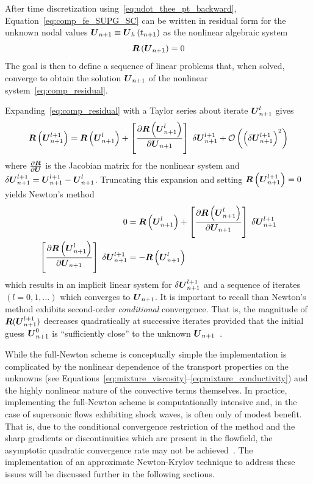 After time discretization using~\eqref{eq:udot_thee_pt_backward}, Equation~\eqref{eq:comp_fe_SUPG_SC} can be written in residual form for the unknown nodal values ${\boldsymbol{U}}_{n+1}\equiv{\boldsymbol{U}}_h\left(t_{n+1}\right)$ as the nonlinear algebraic system
\begin{equation}
  \label{eq:comp_residual}  
  {\boldsymbol{R}}\left({\boldsymbol{U}}_{n+1}\right) = 0 
\end{equation}
The goal is then to define a sequence of linear problems that, when solved, converge to obtain the solution ${\boldsymbol{U}}_{n+1}$ of the nonlinear system~\eqref{eq:comp_residual}. 

Expanding~\eqref{eq:comp_residual} with a Taylor series about iterate ${\boldsymbol{U}}_{n+1}^l$ gives
\begin{equation}
  \label{eq:comp_residual_linearized}  
  {\boldsymbol{R}}\left({\boldsymbol{U}}_{n+1}^{l+1}\right) = {\boldsymbol{R}}\left({\boldsymbol{U}}_{n+1}^l\right) +\left[{\frac{\partial{{\boldsymbol{R}}\left({\boldsymbol{U}}_{n+1}^l\right)}}{\partial{{\boldsymbol{U}}_{n+1}}}}\right]\;\delta{\boldsymbol{U}}_{n+1}^{l+1} + \mathcal{O}\left(\left(\delta{\boldsymbol{U}}_{n+1}^{l+1}\right)^2\right)
\end{equation}
where ${\frac{\partial{{\boldsymbol{R}}}}{\partial{{\boldsymbol{U}}}}}$ is the Jacobian matrix for the nonlinear system and $\delta {\boldsymbol{U}}_{n+1}^{l+1}={\boldsymbol{U}}_{n+1}^{l+1}-{\boldsymbol{U}}_{n+1}^l$. Truncating this expansion and setting ${\boldsymbol{R}}\left({\boldsymbol{U}}_{n+1}^{l+1}\right)=0$ yields Newton's method
\begin{align}
  0 &= {\boldsymbol{R}}\left({\boldsymbol{U}}_{n+1}^l\right) + \left[{\frac{\partial{{\boldsymbol{R}}\left({\boldsymbol{U}}_{n+1}^l\right)}}{\partial{{\boldsymbol{U}}_{n+1}}}}\right]\;\delta{\boldsymbol{U}}_{n+1}^{l+1} \nonumber \\
  \left[{\frac{\partial{{\boldsymbol{R}}\left({\boldsymbol{U}}_{n+1}^l\right)}}{\partial{{\boldsymbol{U}}_{n+1}}}}\right]\;\delta{\boldsymbol{U}}_{n+1}^{l+1} &= -{\boldsymbol{R}}\left({\boldsymbol{U}}_{n+1}^l\right) \label{eq:comp_newton_system}
\end{align}
which results in an implicit linear system for $\delta{\boldsymbol{U}}_{n+1}^{l+1}$ and a sequence of iterates $(l=0,1,\ldots)$ which converges to ${\boldsymbol{U}}_{n+1}$.  It is important to recall than Newton's method exhibits second-order \emph{conditional} convergence. That is, the magnitude of ${\boldsymbol{R}}({\boldsymbol{U}}_{n+1}^{l+1})$ decreases quadratically at successive iterates provided that the initial guess ${\boldsymbol{U}}_{n+1}^0$ is ``sufficiently close'' to the unknown ${\boldsymbol{U}}_{n+1}$~\cite{iserles_numerical_analysis,greenberg_applied_math}.

While the full-Newton scheme is conceptually simple the implementation is complicated by the nonlinear dependence of the transport properties on the unknowns (see Equations~\eqref{eq:mixture_viscosity}--\eqref{eq:mixture_conductivity}) and the highly nonlinear nature of the convective terms themselves.  In practice, implementing the full-Newton scheme is computationally intensive and, in the case of supersonic flows exhibiting shock waves, is often only of modest benefit.  That is, due to the conditional convergence restriction of the method and the sharp gradients or discontinuities which are present in the flowfield, the asymptotic quadratic convergence rate may not be achieved~\cite{johan_hughes_shakib_mf}. The implementation of an approximate Newton-Krylov technique to address these issues will be discussed further in the following sections.

